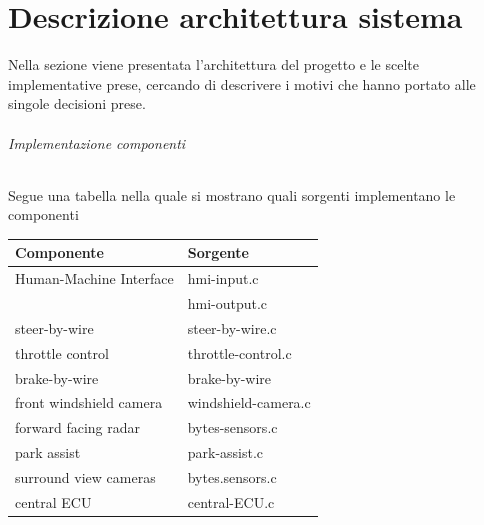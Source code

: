\documentclass[11pt, openany]{article}
\theoremstyle{definition}
\theoremstyle{plain}
\theoremstyle{remark}
\begin{document}
	\part{Descrizione architettura sistema}
		Nella sezione viene presentata l'architettura del progetto e le scelte implementative prese, cercando di descrivere i motivi che hanno portato alle singole decisioni prese.

		\paragraph{Implementazione componenti}
			\footnotesize Segue una tabella nella quale si mostrano quali sorgenti implementano le componenti
			\normalsize

			\begin{tcolorbox}[width=\textwidth,colback={Cornsilk2}]\label{tab:sorgenti}
				\begin{tabularx}{\textwidth}{p{8cm}  l}
					\textbf{Componente}			&	\textbf{Sorgente}	\\\toprule
					Human-Machine Interface 	& 	hmi-input.c			\\
												&	hmi-output.c		\\\midrule
					steer-by-wire				&	steer-by-wire.c		\\\midrule
					throttle control			&	throttle-control.c	\\\midrule
					brake-by-wire				&	brake-by-wire		\\\midrule
					front windshield camera		&	windshield-camera.c	\\\midrule
					forward facing radar		&	bytes-sensors.c		\\\midrule
					park assist					&	park-assist.c		\\\midrule
					surround view cameras		&	bytes.sensors.c		\\\midrule
					central ECU					&	central-ECU.c


				\end{tabularx}
			\end{tcolorbox}
\end{document}
